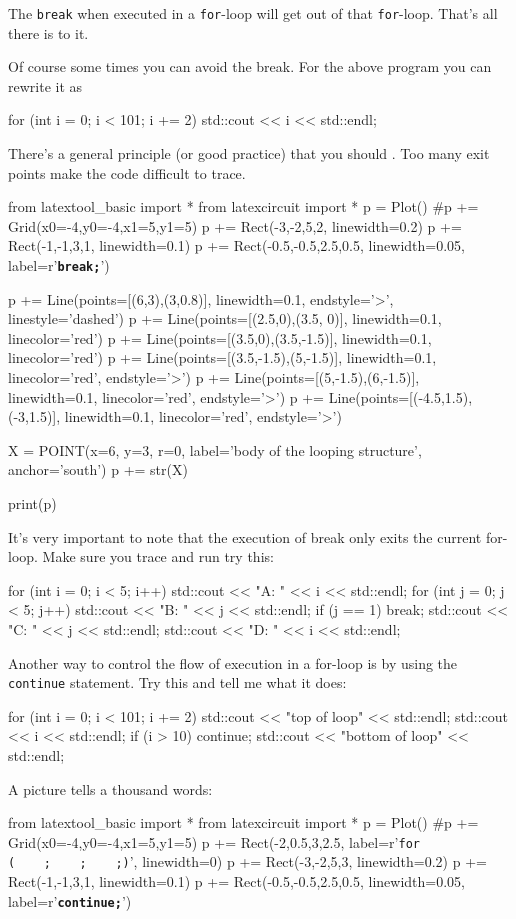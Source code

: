 \begin{console}
The \texttt{break} when executed in a \texttt{for}-loop will get out of that \texttt{for}-loop. That's all there is to it.

Of course some times you can avoid the break. For the above program you
can rewrite it as
\begin{console}
for (int i = 0; i < 101; i += 2)
{   
    std::cout << i << std::endl;
}
\end{console}
There's a general principle (or good practice) that you
should . Too
many exit points make the code difficult to trace.
\begin{python}
from latextool_basic import *
from latexcircuit import *
p = Plot()
#p += Grid(x0=-4,y0=-4,x1=5,y1=5)
p += Rect(-3,-2,5,2, linewidth=0.2)
p += Rect(-1,-1,3,1, linewidth=0.1)
p += Rect(-0.5,-0.5,2.5,0.5, linewidth=0.05, label=r'\texttt{\textbf{break;}}')


p += Line(points=[(6,3),(3,0.8)], linewidth=0.1, endstyle='>', linestyle='dashed')
p += Line(points=[(2.5,0),(3.5, 0)], linewidth=0.1, linecolor='red')
p += Line(points=[(3.5,0),(3.5,-1.5)], linewidth=0.1, linecolor='red')
p += Line(points=[(3.5,-1.5),(5,-1.5)], linewidth=0.1, linecolor='red', endstyle='>')
p += Line(points=[(5,-1.5),(6,-1.5)], linewidth=0.1, linecolor='red', endstyle='>')
p += Line(points=[(-4.5,1.5),(-3,1.5)], linewidth=0.1, linecolor='red', endstyle='>')

X = POINT(x=6, y=3, r=0, label='body of the looping structure', anchor='south')
p += str(X)

print(p)
\end{python}
It's very important to note that the execution of break
only exits the current for-loop. Make sure you trace and run try this:
\begin{console}
for (int i = 0; i < 5; i++)
{   
    std::cout << "A: " << i << std::endl;
    for (int j = 0; j < 5; j++)
    {   
        std::cout << "B: " << j << std::endl;
        if (j == 1) break;
        std::cout << "C: " << j << std::endl;
    }
    std::cout << "D: " << i << std::endl;
}
\end{console}
\newpage{}

Another way to control the flow of execution in a for-loop is by using
the \texttt{continue} statement. Try this and tell me what it does:
\begin{console}
for (int i = 0; i < 101; i += 2)
{   
    std::cout << "top of loop" << std::endl;
    std::cout << i << std::endl;
    if (i > 10) continue;
    std::cout << "bottom of loop" << std::endl;
}
\end{console}
A picture tells a thousand words:
\begin{python}
from latextool_basic import *
from latexcircuit import *
p = Plot()
#p += Grid(x0=-4,y0=-4,x1=5,y1=5)
p += Rect(-2,0.5,3,2.5, label=r'\large{\texttt{for  (\ \ \ \ ;\ \ \ \ ;\ \ \ \ ;)}}', linewidth=0)
p += Rect(-3,-2,5,3, linewidth=0.2)
p += Rect(-1,-1,3,1, linewidth=0.1)
p += Rect(-0.5,-0.5,2.5,0.5, linewidth=0.05, label=r'\texttt{\textbf{continue;}}')



\end{python}
\end{console}
